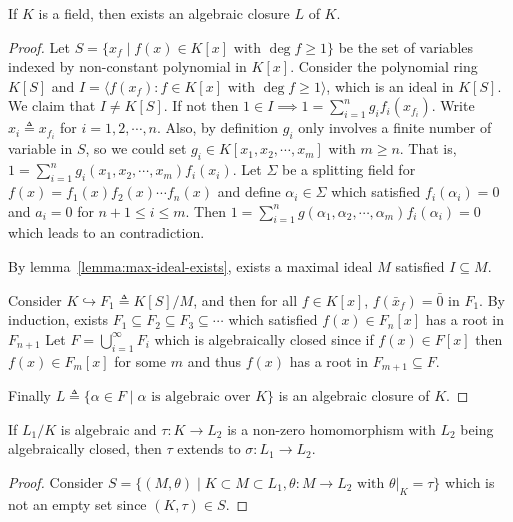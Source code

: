 \begin{theorem}
  If $K$ is a field, then exists an algebraic closure $L$ of $K$.

  \begin{proof}
    Let $S = \{ x_f \mid f(x) \in K[x] \text{ with } \deg f \geq 1 \}$ be the set of variables indexed by non-constant
    polynomial in $K[x]$. Consider the polynomial ring $K[S]$ and $I = \langle f(x_f) : f \in K[x] \text{ with } \deg f \geq 1 \rangle$,
    which is an ideal in $K[S]$. We claim that $I \neq K[S]$. If not then $1 \in I \implies 1 = \sum_{i = 1}^n g_i f_i(x_{f_i})$.
    Write $x_i \triangleq x_{f_i}$ for $i = 1, 2, \cdots, n$. Also, by definition $g_i$ only involves a finite number of
    variable in $S$, so we could set $g_i \in K[x_1, x_2, \cdots, x_m]$ with $m \geq n$. That is, $1 = \sum_{i = 1}^n g_i(x_1, x_2,
    \cdots, x_m) f_i(x_i)$. Let $\Sigma$ be a splitting field for $f(x) = f_1(x) f_2(x) \cdots f_n(x)$ and define $\alpha_i \in \Sigma$
    which satisfied $f_i(\alpha_i) = 0$ and $a_i = 0$ for $n+1 \leq i \leq m$. Then
    $1 = \sum_{i = 1}^n g(\alpha_1, \alpha_2, \cdots, \alpha_m) f_i(\alpha_i) = 0$ which leads to an contradiction.

    By lemma~\ref{lemma:max-ideal-exists}, exists a maximal ideal $M$ satisfied $I \subseteq M$.

    Consider $K \hookrightarrow F_1 \triangleq K[S] / M$, and then for all $f \in K[x]$, $f(\bar{x}_f) = \bar{0}$ in $F_1$.
    By induction, exists $F_1 \subseteq F_2 \subseteq F_3 \subseteq \cdots$ which satisfied $f(x) \in F_n[x]$ has a root in $F_{n+1}$
    Let $F = \bigcup_{i = 1}^\infty F_i$ which is algebraically closed since if $f(x) \in F[x]$ then $f(x) \in F_m[x]$
    for some $m$ and thus $f(x)$ has a root in $F_{m+1} \subseteq F$.

    Finally $L \triangleq \{ \alpha \in F \mid \alpha \text{ is algebraic over } K \}$ is an algebraic closure of $K$.
  \end{proof}

  \begin{lemma}
    If $L_1 / K$ is algebraic and $\tau: K \to L_2$ is a non-zero homomorphism with $L_2$ being algebraically closed,
    then $\tau$ extends to $\sigma: L_1 \to L_2$.

    \begin{proof}
      Consider $S = \{ (M, \theta) \mid K \subset M \subset L_1, \theta: M \to L_2 \text{ with } \theta\big|_K = \tau\}$
      which is not an empty set since $(K, \tau) \in S$.


\end{proof}
\end{lemma}
\end{theorem}
